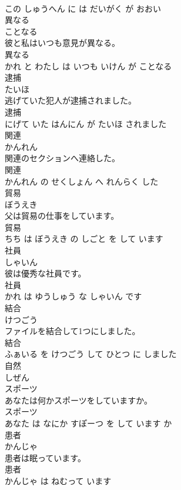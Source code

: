 \documentclass[8pt]{extreport}
\begin{document}
\begin{CJK}{UTF8}{min}
\\	この しゅうへん に は だいがく が おおい			
\\	異なる	
\\	ことなる			
\\	彼と私はいつも意見が異なる。	
\\	異なる 
\\	かれ と わたし は いつも いけん が ことなる			
\\	逮捕	
\\	たいほ			
\\	逃げていた犯人が逮捕されました。	
\\	逮捕 
\\	にげて いた はんにん が たいほ されました			
\\	関連	
\\	かんれん			
\\	関連のセクションへ連絡した。	
\\	関連 
\\	かんれん の せくしょん へ れんらく した			
\\	貿易	
\\	ぼうえき			
\\	父は貿易の仕事をしています。	
\\	貿易 
\\	ちち は ぼうえき の しごと を して います			
\\	社員	
\\	しゃいん			
\\	彼は優秀な社員です。	
\\	社員 
\\	かれ は ゆうしゅう な しゃいん です			
\\	結合	
\\	けつごう			
\\	ファイルを結合して1つにしました。	
\\	結合 
\\	ふぁいる を けつごう して ひとつ に しました			
\\	自然	
\\	しぜん			
\\	スポーツ	
\\	あなたは何かスポーツをしていますか。	
\\	スポーツ 
\\	あなた は なにか すぽーつ を して います か			
\\	患者	
\\	かんじゃ			
\\	患者は眠っています。	
\\	患者 
\\	かんじゃ は ねむって います			

\end{CJK}
\end{document}
